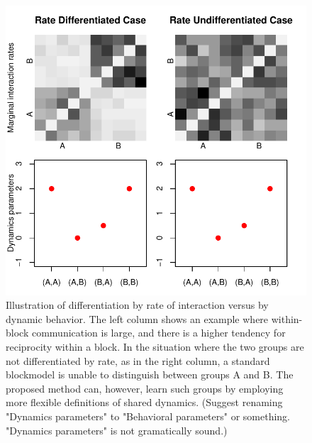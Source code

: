 \begin{figure}
\centering
\includegraphics[scale=.45]{../figs/introexample/all}
\caption{Illustration of differentiation by rate of interaction versus by dynamic behavior.  The left column shows an example where within-block communication is large, and there is a higher tendency for reciprocity within a block.  In the situation where the two groups are not differentiated by rate, as in the right column, a standard blockmodel is unable to distinguish between groups A and B.  The proposed method can, however, learn such groups by employing more flexible definitions of shared dynamics. {\color{red} (Suggest renaming "Dynamics parameters" to "Behavioral parameters" or something.  "Dynamics parameters" is not gramatically sound.)}}
\label{fig:example}
\end{figure}
